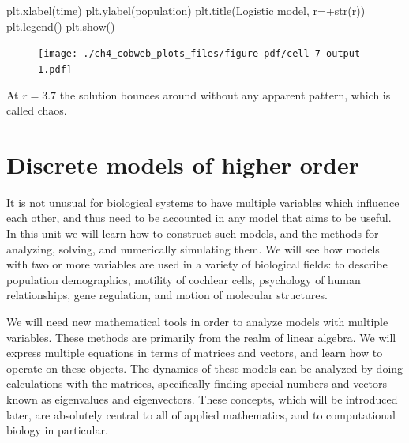 \documentclass[
  letterpaper,
  DIV=11,
  numbers=noendperiod]{scrreprt}
\newenvironment{Shaded}{\begin{snugshade}}{\end{snugshade}}
\newcommand{\BuiltInTok}[1]{\textcolor[rgb]{0.00,0.23,0.31}{#1}}
\newcommand{\NormalTok}[1]{\textcolor[rgb]{0.00,0.23,0.31}{#1}}
\newcommand{\OperatorTok}[1]{\textcolor[rgb]{0.37,0.37,0.37}{#1}}
\newcommand{\StringTok}[1]{\textcolor[rgb]{0.13,0.47,0.30}{#1}}
\begin{document}
\begin{Shaded}
\begin{Highlighting}[]
\NormalTok{plt.xlabel(}\StringTok{\textquotesingle{}time\textquotesingle{}}\NormalTok{)}
\NormalTok{plt.ylabel(}\StringTok{\textquotesingle{}population\textquotesingle{}}\NormalTok{)}
\NormalTok{plt.title(}\StringTok{\textquotesingle{}Logistic model, r=\textquotesingle{}}\OperatorTok{+}\BuiltInTok{str}\NormalTok{(r))}
\NormalTok{plt.legend()}
\NormalTok{plt.show()}
\end{Highlighting}
\end{Shaded}

\begin{figure}[H]

{\centering \texttt{[image: ./ch4\_cobweb\_plots\_files/figure-pdf/cell-7-output-1.pdf]}

}

\end{figure}

At \(r=3.7\) the solution bounces around without any apparent pattern,
which is called chaos.


\hypertarget{discrete-models-of-higher-order}{%
\chapter{Discrete models of higher
order}\label{discrete-models-of-higher-order}}

It is not unusual for biological systems to have multiple variables
which influence each other, and thus need to be accounted in any model
that aims to be useful. In this unit we will learn how to construct such
models, and the methods for analyzing, solving, and numerically
simulating them. We will see how models with two or more variables are
used in a variety of biological fields: to describe population
demographics, motility of cochlear cells, psychology of human
relationships, gene regulation, and motion of molecular structures.

We will need new mathematical tools in order to analyze models with
multiple variables. These methods are primarily from the realm of linear
algebra. We will express multiple equations in terms of matrices and
vectors, and learn how to operate on these objects. The dynamics of
these models can be analyzed by doing calculations with the matrices,
specifically finding special numbers and vectors known as eigenvalues
and eigenvectors. These concepts, which will be introduced later, are
absolutely central to all of applied mathematics, and to computational
biology in particular.
\end{document}
